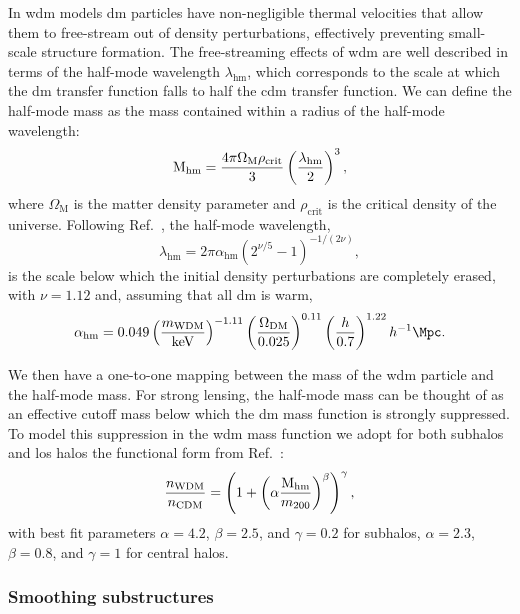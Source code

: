 In \gls*{wdm} models \gls*{dm} particles have non-negligible thermal velocities that allow them to free-stream out of density perturbations, effectively preventing small-scale structure formation. The free-streaming effects of \gls*{wdm} are well described in terms of the half-mode wavelength $\lambda_{\mathrm{hm}}$, which corresponds to the scale at which the \gls*{dm} transfer function falls to half the \gls*{cdm} transfer function. We can define the half-mode mass as the mass contained within a radius of the half-mode wavelength:
\begin{equation}
\mathrm{M_{hm}}=\frac{4\pi\Omega_{\mathrm{M}}\rho_{\mathrm{crit}}}{3}\left(\frac{\lambda_{\mathrm{hm}}}{2}\right)^3,
\end{equation}
where $\Omega_{\mathrm{M}}$ is the matter density parameter and $\rho_{\mathrm{crit}}$ is the critical density of the universe.
Following Ref.~\cite{Schneider:2011yu}, the half-mode wavelength,
\begin{equation}
    \lambda_{\mathrm{hm}}=2\pi\alpha_{\mathrm{hm}}\left(2^{\nu/5}-1\right)^{-1/(2\nu)},
\end{equation}    
is the scale below which the initial density perturbations are completely erased, with $\nu= 1.12$ and, assuming that all \gls*{dm} is warm,
\begin{equation}
\alpha_{\mathrm{hm}}=0.049\left(\frac{m_\mathrm{WDM}}{\si{\keV}}\right)^{-1.11}\left(\frac{\Omega_\mathrm{DM}}{0.025}\right)^{0.11}\left(\frac{h}{0.7}\right)^{1.22}h^{-1}\si{\Mpc}.
\end{equation}

We then have a one-to-one mapping between the mass of the \gls*{wdm} particle and the half-mode mass.
For strong lensing, the half-mode mass can be thought of as an effective cutoff mass below which the \gls*{dm} mass function is strongly suppressed. To model this suppression in the \gls*{wdm} mass function we adopt for both subhalos and \gls*{los} halos the functional form from Ref.~\cite{Lovell:2020bcy}:
\begin{equation}\label{eq:cutoff}
    \frac{n_{\mathrm{WDM}}}{n_{\mathrm{CDM}}}=\left(1+\left(\alpha\frac{\mathrm{M_{hm}}}{m_{200}}\right)^\beta\right)^\gamma,
\end{equation}
with best fit parameters $\alpha=4.2$, $\beta=2.5$, and $\gamma=0.2$ for subhalos, $\alpha=2.3$, $\beta=0.8$, and $\gamma=1$ for central halos.

\subsubsection{Smoothing substructures}
\label{subsubsec:smoothing}

